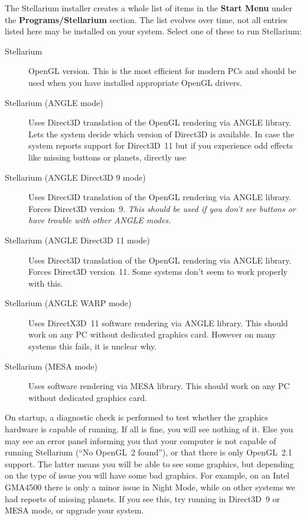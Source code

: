 The Stellarium installer creates a whole list of items in the
\textbf{Start Menu} under the \textbf{Programs/Stellarium}
section. The list evolves over time, not all entries listed here 
may be installed on your system. Select one of these to run Stellarium:
\begin{description}
  \item[Stellarium] OpenGL version. This is the most efficient for
    modern PCs and should be used when you have installed appropriate
    OpenGL drivers.
  \item[Stellarium (ANGLE mode)] Uses Direct3D translation of the
    OpenGL rendering via ANGLE library. Lets the system decide which
    version of Direct3D is available. In case the system reports
    support for Direct3D~11 but if you experience odd effects like
    missing buttons or planets, directly use
  \item[Stellarium (ANGLE Direct3D 9 mode)] Uses Direct3D translation
    of the OpenGL rendering via ANGLE library. Forces Direct3D
    version~9. \emph{This should be used if you don't see buttons or have
    trouble with other ANGLE modes.}
  \item[Stellarium (ANGLE Direct3D 11 mode)] Uses Direct3D translation
    of the OpenGL rendering via ANGLE library. Forces Direct3D
    version~11. Some systems don't seem to work properly with this.
  \item[Stellarium (ANGLE WARP mode)] Uses DirectX3D~11 software rendering via ANGLE
    library. This should work on any PC without dedicated graphics
    card. However on many systems this fails, it is unclear why.
  \item[Stellarium (MESA mode)] Uses software rendering via MESA
    library. This should work on any PC without dedicated graphics
    card. 
\end{description}
  On startup, a diagnostic check is performed to test whether the
  graphics hardware is capable of running. If all is fine, you will
  see nothing of it.  Else you may see an error panel informing you
  that your computer is not capable of running Stellarium (``No
  OpenGL~2 found''), or that there is only OpenGL~2.1 support. The
  latter means you will be able to see some graphics, but depending on
  the type of issue you will have some bad graphics. For example, on
  an Intel GMA4500 there is only a minor issue in Night Mode, while on
  other systems we had reports of missing planets. If you see this,
  try running in Direct3D~9 or MESA mode, or upgrade your system.

